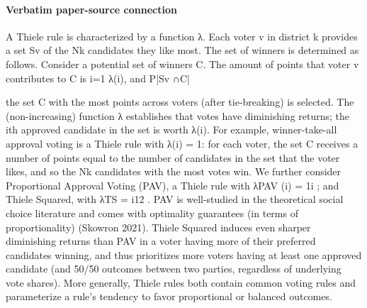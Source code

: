 \documentclass[10pt]{article}
\begin{document}
\paragraph{Verbatim paper-source connection}
\begin{ReviewVerbatim}
A Thiele rule is characterized by a function λ. Each voter v in district k provides a set Sv
of the Nk candidates they like most. The set of winners is determined as follows. Consider a
potential set of winners C. The amount of points that voter v contributes to C is i=1         λ(i), and
                                                                                     P|Sv ∩C|

the set C with the most points across voters (after tie-breaking) is selected. The (non-increasing)
function λ establishes that votes have diminishing returns; the ith approved candidate in the set is
worth λ(i). For example, winner-take-all approval voting is a Thiele rule with λ(i) = 1: for each
voter, the set C receives a number of points equal to the number of candidates in the set that the
voter likes, and so the Nk candidates with the most votes win. We further consider Proportional
Approval Voting (PAV), a Thiele rule with λPAV (i) = 1i ; and Thiele Squared, with λTS = i12 . PAV
is well-studied in the theoretical social choice literature and comes with optimality guarantees (in
terms of proportionality) (Skowron 2021). Thiele Squared induces even sharper diminishing returns
than PAV in a voter having more of their preferred candidates winning, and thus prioritizes more
voters having at least one approved candidate (and 50/50 outcomes between two parties, regardless
of underlying vote shares). More generally, Thiele rules both contain common voting rules and
parameterize a rule’s tendency to favor proportional or balanced outcomes.
\end{ReviewVerbatim}
\end{document}
